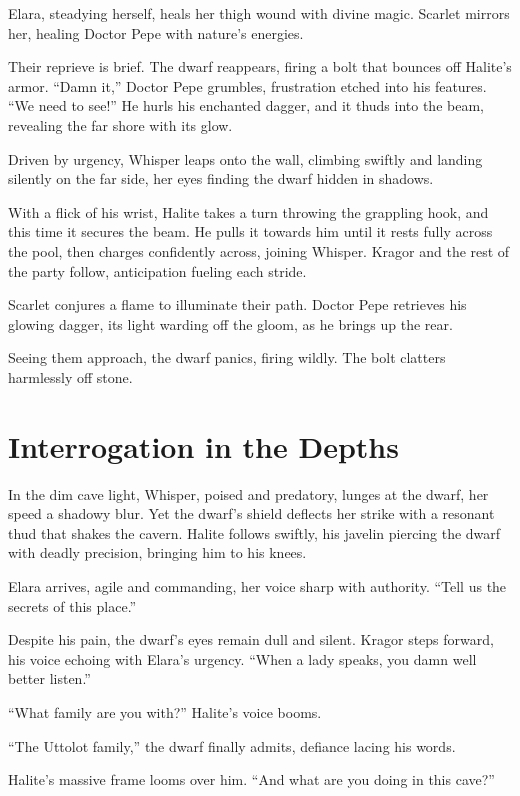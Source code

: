 \documentclass[
  letterpaper,12pt,twoside,twocolumn,openany,
  nodeprecatedcode,bg=full]{dndbook}
\begin{document}
Elara, steadying herself, heals her thigh wound with divine magic.
Scarlet mirrors her, healing Doctor Pepe with nature's energies.

Their reprieve is brief. The dwarf reappears, firing a bolt that bounces
off Halite's armor. ``Damn it,'' Doctor Pepe grumbles, frustration
etched into his features. ``We need to see!'' He hurls his enchanted
dagger, and it thuds into the beam, revealing the far shore with its
glow.

Driven by urgency, Whisper leaps onto the wall, climbing swiftly and
landing silently on the far side, her eyes finding the dwarf hidden in
shadows.

With a flick of his wrist, Halite takes a turn throwing the grappling
hook, and this time it secures the beam. He pulls it towards him until
it rests fully across the pool, then charges confidently across, joining
Whisper. Kragor and the rest of the party follow, anticipation fueling
each stride.

Scarlet conjures a flame to illuminate their path. Doctor Pepe retrieves
his glowing dagger, its light warding off the gloom, as he brings up the
rear.

Seeing them approach, the dwarf panics, firing wildly. The bolt clatters
harmlessly off stone.

\section{Interrogation in the Depths}\label{interrogation-in-the-depths}

In the dim cave light, Whisper, poised and predatory, lunges at the
dwarf, her speed a shadowy blur. Yet the dwarf's shield deflects her
strike with a resonant thud that shakes the cavern. Halite follows
swiftly, his javelin piercing the dwarf with deadly precision, bringing
him to his knees.

Elara arrives, agile and commanding, her voice sharp with authority.
``Tell us the secrets of this place.''

Despite his pain, the dwarf's eyes remain dull and silent. Kragor steps
forward, his voice echoing with Elara's urgency. ``When a lady speaks,
you damn well better listen.''

``What family are you with?'' Halite's voice booms.

``The Uttolot family,'' the dwarf finally admits, defiance lacing his
words.

Halite's massive frame looms over him. ``And what are you doing in this
cave?''
\end{document}
